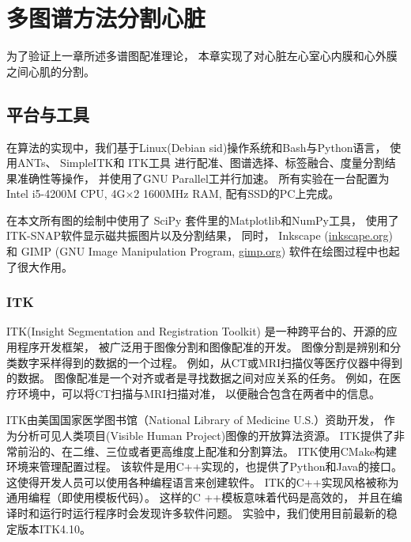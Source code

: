 
\chapter{多图谱方法分割心脏}
为了验证上一章所述多谱图配准理论，
本章实现了对心脏左心室心内膜和心外膜之间心肌的分割。

\section{平台与工具}
在算法的实现中，我们基于Linux(Debian sid)操作系统和Bash与Python语言，
使用ANTs、
SimpleITK和
ITK工具
进行配准、图谱选择、标签融合、度量分割结果准确性等操作，
并使用了GNU Parallel工并行加速。
所有实验在一台配置为Intel i5-4200M CPU, 4G$\times$2 1600MHz RAM, 
配有SSD的PC上完成。

在本文所有图的绘制中使用了
SciPy
套件里的Matplotlib和NumPy工具，
使用了ITK-SNAP软件显示磁共振图片以及分割结果，
同时， Inkscape (\href{http://inkscape.org}{inkscape.org}) 和 GIMP (GNU Image Manipulation Program, \href{http://gimp.org}{gimp.org}) 软件在绘图过程中也起了很大作用。

\subsection{ITK}
ITK(Insight Segmentation and Registration Toolkit)
是一种跨平台的、开源的应用程序开发框架，
被广泛用于图像分割和图像配准的开发。
图像分割是辨别和分类数字采样得到的数据的一个过程。
例如，从CT或MRI扫描仪等医疗仪器中得到的数据。
图像配准是一个对齐或者是寻找数据之间对应关系的任务。
例如，在医疗环境中，可以将CT扫描与MRI扫描对准，
以便融合包含在两者中的信息。

ITK由美国国家医学图书馆（National Library of Medicine U.S.）资助开发，
作为分析可见人类项目(Visible Human Project)图像的开放算法资源。
ITK提供了非常前沿的、在二维、三位或者更高维度上配准和分割算法。
ITK使用CMake构建环境来管理配置过程。
该软件是用C++实现的，也提供了Python和Java的接口。
这使得开发人员可以使用各种编程语言来创建软件。
ITK的C++实现风格被称为通用编程（即使用模板代码）。
这样的C ++模板意味着代码是高效的，
并且在编译时和运行时运行程序时会发现许多软件问题。
实验中，我们使用目前最新的稳定版本ITK4.10。
